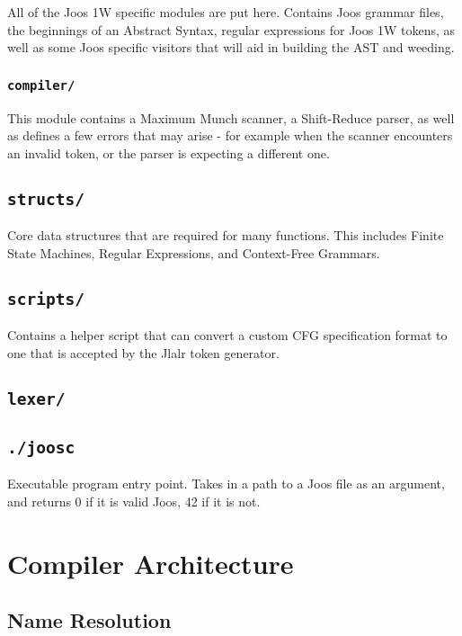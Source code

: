 \documentclass[12pt, a4paper]{article}
\begin{document}
All of the Joos 1W specific modules are put here. Contains Joos grammar files, the beginnings of an Abstract Syntax, regular expressions for Joos 1W tokens, as well as some Joos specific visitors that will aid in building the AST and weeding.
\subsubsection{\texttt{compiler/}}

This module contains a Maximum Munch scanner, a Shift-Reduce parser, as well as defines a few errors that may arise - for example when the scanner encounters an invalid token, or the parser is expecting a different one.

\subsection{\texttt{structs/}}

Core data structures that are required for many functions. This includes Finite State Machines, Regular Expressions, and Context-Free Grammars.

\subsection{\texttt{scripts/}}

Contains a helper script that can convert a custom CFG specification format to one that is accepted by the Jlalr token generator.

\subsection{\texttt{lexer/}}


\subsection{\texttt{./joosc}}

Executable program entry point. Takes in a path to a Joos file as an argument, and returns 0 if it is valid Joos, 42 if it is not.

\section{Compiler Architecture}

\subsection{Name Resolution}
\end{document}
